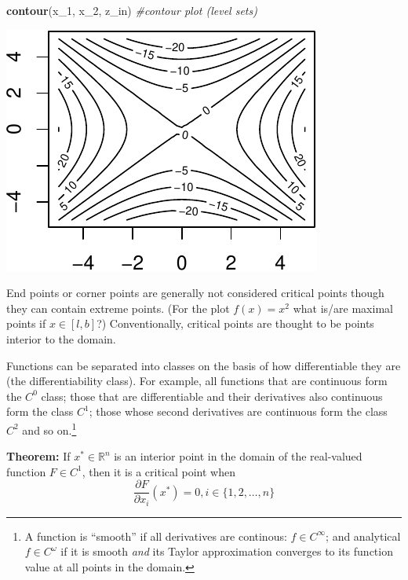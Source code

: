 \documentclass[11pt,]{article}
\newenvironment{Shaded}{\begin{snugshade}}{\end{snugshade}}
\newcommand{\KeywordTok}[1]{\textcolor[rgb]{0.13,0.29,0.53}{\textbf{#1}}}
\newcommand{\DecValTok}[1]{\textcolor[rgb]{0.00,0.00,0.81}{#1}}
\newcommand{\CommentTok}[1]{\textcolor[rgb]{0.56,0.35,0.01}{\textit{#1}}}
\newcommand{\NormalTok}[1]{#1}
\let\rmarkdownfootnote\footnote%
\def\footnote{\protect\rmarkdownfootnote}
\begin{document}
\begin{Shaded}
\begin{Highlighting}[]
\KeywordTok{contour}\NormalTok{(x_}\DecValTok{1}\NormalTok{, x_}\DecValTok{2}\NormalTok{, z_in) }\CommentTok{#contour plot (level sets)}
\end{Highlighting}
\end{Shaded}

\begin{center}\includegraphics{Optimization_files/figure-latex/FOC_dim_2-6} \end{center}

End points or corner points are generally not considered critical points
though they can contain extreme points. (For the plot \(f(x)=x^2\) what
is/are maximal points if \(x\in [l, b]\)?) Conventionally, critical
points are thought to be points interior to the domain.

Functions can be separated into classes on the basis of how
differentiable they are (the differentiability class). For example, all
functions that are continuous form the \(C^0\) class; those that are
differentiable and their derivatives also continuous form the class
\(C^1\); those whose second derivatives are continuous form the class
\(C^2\) and so on.\footnote{A function is ``smooth'' if all derivatives
  are continous: \(f\in C^{\infty}\); and analytical
  \(f \in C^{\omega}\) if it is smooth \emph{and} its Taylor
  approximation converges to its function value at all points in the
  domain.}

\textbf{Theorem:} If \(x^*\in \mathbb{R}^n\) is an interior point in the
domain of the real-valued function \(F\in C^1\), then it is a critical
point when \[
  \frac{\partial F}{\partial x_i}(x^*) = 0, i\in \{1, 2,\hdots, n\}
\]
\end{document}
